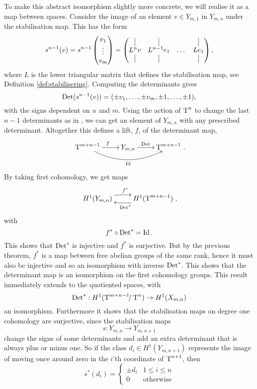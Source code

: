 To make this abstract isomorphism slightly more concrete, we will
realise it as a map between spaces. Consider the image of an element
$v \in Y_{m,1}$ in $Y_{m,n}$ under the stabilisation map. This has the
form 
\[ s^{n-1}(v) = s^{n-1}
\begin{pmatrix}
  v_1 \\
  \vdots \\
  v_m
\end{pmatrix} =
\begin{pmatrix}
  \vrule & \vrule & & \vrule \\
  L^{n} v & L^{n-1}e_1 & \dots & Le_1 \\
  \vrule & \vrule & & \vrule
\end{pmatrix},
\]
where $L$ is the lower triangular matrix that defines the
stabilisation map, see Definition \ref{def:stabilisering}. Computing the
determinants gives
\[ \operatorname{Det}(s^{n-1}(v)) = (\pm v_1,\dots,\pm v_m, \pm 1, \dots,\pm 1), \]
with the signs dependent on $n$ and $m$. Using the action of
$\operatorname{T}^{n}$ to change the last $n-1$ determinants as in
, we can get an element of $Y_{m,n}$ with any prescribed
determinant. Altogether this defines a lift, $f$, of the
determinant map,
\[ \xymatrix{ \T^{m+n-1} \ar[r]^f \ar@/_1.5pc/[rr]_\Id & Y_{m,n}
  \ar[r]^<<<<<\Det & \T^{m+n-1}}. \]
By taking first cohomology, we get maps
\[ \xymatrix{ H^1(Y_{m,n}) \ar@/^/[r]^{f^*} & H^1(\T^{m+n-1})
  \ar@/^/[l]^{\Det^*} }, \]
with 
\[ f^* \circ \operatorname{Det}^* = \operatorname{Id}. \]
This shows that $\operatorname{Det}^*$ is injective and $f^*$ is surjective. But by
the previous theorem, $f^*$ is a map between free abelian groups of
the same rank, hence it must also be injective and so an
isomorphism with inverse $\operatorname{Det}^*$. This shows that the determinant map
is an isomorphism on the first cohomology groups.
This result immediately extends to the quotiented spaces, with
\[ \operatorname{Det}^* : H^1(\operatorname{T}^{m+n-1}\!\!/\operatorname{T}^{n}) \to H^1(X_{m,n}) \]
an isomorphism. Furthermore it shows that the stabilisation maps on
degree one cohomology are surjective, since the stabilisation maps
\[ s: Y_{m,n} \to Y_{m,n+1} \]
change the signs of some determinants and add an extra determinant
that is always plus or minus one. So if the class $d_i \in
H^1(Y_{m,n+1})$ represents the image of moving once around zero in the
$i$'th coordinate of $\operatorname{T}^{n+1}$, then
\[ s^*(d_i) =
\begin{cases}
  \pm d_i & 1 \leq i \leq n \\
  0 & \text{otherwise}
\end{cases} \] 



